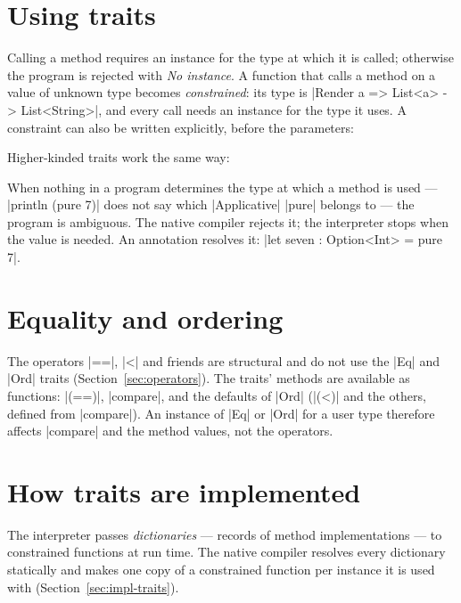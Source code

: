 

\section{Using traits}
Calling a method requires an instance for the type at which it is called;
otherwise the program is rejected with \textit{No instance}. A function that
calls a method on a value of unknown type becomes \emph{constrained}: its
type is \fc|Render a => List<a> -> List<String>|, and every call needs an
instance for the type it uses. A constraint can also be written explicitly,
before the parameters:


Higher-kinded traits work the same way:


\begin{notebox}[Ambiguity]
When nothing in a program determines the type at which a method is used ---
\fc|println (pure 7)| does not say which \fc|Applicative| \fc|pure| belongs
to --- the program is ambiguous. The native compiler rejects it; the
interpreter stops when the value is needed. An annotation resolves it:
\fc|let seven : Option<Int> = pure 7|.
\end{notebox}

\section{Equality and ordering}
The operators \fc|==|, \fc|<| and friends are structural and do not use the
\fc|Eq| and \fc|Ord| traits (Section~\ref{sec:operators}). The traits' methods
are available as functions: \fc|(==)|, \fc|compare|, and the defaults of
\fc|Ord| (\fc|(<)| and the others, defined from \fc|compare|). An instance of
\fc|Eq| or \fc|Ord| for a user type therefore affects \fc|compare| and the
method values, not the operators.

\section{How traits are implemented}
The interpreter passes \emph{dictionaries} --- records of method
implementations --- to constrained functions at run time. The native
compiler resolves every dictionary statically and makes one copy of a
constrained function per instance it is used with
(Section~\ref{sec:impl-traits}).
